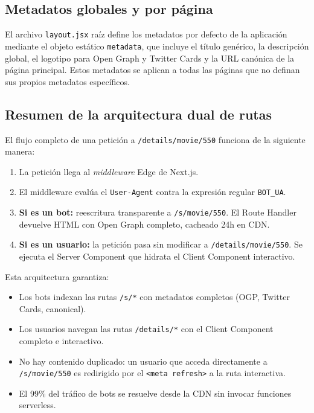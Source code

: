 \subsection{Metadatos globales y por página}

El archivo \texttt{layout.jsx} raíz define los metadatos por defecto de la aplicación mediante el objeto estático \texttt{metadata}, que incluye el título genérico, la descripción global, el logotipo para Open Graph y Twitter Cards y la URL canónica de la página principal. Estos metadatos se aplican a todas las páginas que no definan sus propios metadatos específicos.

\subsection{Resumen de la arquitectura dual de rutas}

El flujo completo de una petición a \texttt{/details/movie/550} funciona de la siguiente manera:

\begin{enumerate}
\item La petición llega al \textit{middleware} Edge de Next.js.
\item El middleware evalúa el \texttt{User-Agent} contra la expresión regular \texttt{BOT\_UA}.
\item \textbf{Si es un bot:} reescritura transparente a \texttt{/s/movie/550}. El Route Handler devuelve HTML con Open Graph completo, cacheado 24h en CDN.
\item \textbf{Si es un usuario:} la petición pasa sin modificar a \texttt{/details/movie/550}. Se ejecuta el Server Component que hidrata el Client Component interactivo.
\end{enumerate}

Esta arquitectura garantiza:
\begin{itemize}
\item Los bots indexan las rutas \texttt{/s/*} con metadatos completos (OGP, Twitter Cards, canonical).
\item Los usuarios navegan las rutas \texttt{/details/*} con el Client Component completo e interactivo.
\item No hay contenido duplicado: un usuario que acceda directamente a \texttt{/s/movie/550} es redirigido por el \texttt{<meta refresh>} a la ruta interactiva.
\item El 99\% del tráfico de bots se resuelve desde la CDN sin invocar funciones serverless.
\end{itemize}

